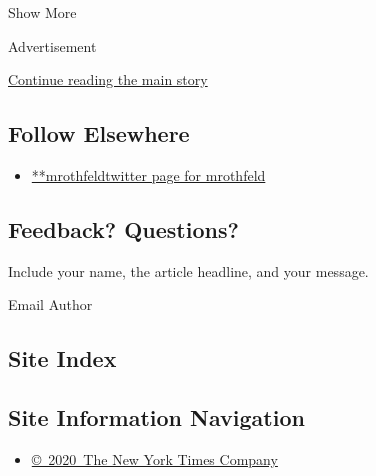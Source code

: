 Show More

Advertisement

\protect\hyperlink{after-mid2}{Continue reading the main story}

\hypertarget{follow-elsewhere}{%
\subsection{Follow Elsewhere}\label{follow-elsewhere}}

\begin{itemize}
\tightlist
\item
  \href{https://twitter.com/mrothfeld}{**mrothfeldtwitter page for
  mrothfeld}
\end{itemize}

\hypertarget{feedback-questions}{%
\subsection{Feedback? Questions?}\label{feedback-questions}}

Include your name, the article headline, and your message.

Email Author

\hypertarget{site-index}{%
\subsection{Site Index}\label{site-index}}

\hypertarget{site-information-navigation}{%
\subsection{Site Information
Navigation}\label{site-information-navigation}}

\begin{itemize}
\tightlist
\item
  \href{https://help.nytimes3xbfgragh.onion/hc/en-us/articles/115014792127-Copyright-notice}{©~2020~The
  New York Times Company}
\end{itemize}

